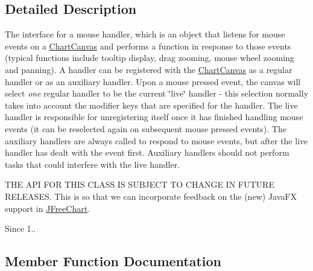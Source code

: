 \subsection{Detailed Description}
The interface for a mouse handler, which is an object that listens for mouse events on a \mbox{\hyperlink{classorg_1_1jfree_1_1chart_1_1fx_1_1_chart_canvas}{Chart\+Canvas}} and performs a function in response to those events (typical functions include tooltip display, drag zooming, mouse wheel zooming and panning). A handler can be registered with the \mbox{\hyperlink{classorg_1_1jfree_1_1chart_1_1fx_1_1_chart_canvas}{Chart\+Canvas}} as a regular handler or as an auxiliary handler. Upon a mouse pressed event, the canvas will select {\itshape one} regular handler to be the current \char`\"{}live\char`\"{} handler -\/ this selection normally takes into account the modifier keys that are specified for the handler. The live handler is responsible for unregistering itself once it has finished handling mouse events (it can be reselected again on subsequent mouse pressed events). The auxiliary handlers are always called to respond to mouse events, but after the live handler has dealt with the event first. Auxiliary handlers should not perform tasks that could interfere with the live handler.

T\+HE A\+PI F\+OR T\+H\+IS C\+L\+A\+SS IS S\+U\+B\+J\+E\+CT TO C\+H\+A\+N\+GE IN F\+U\+T\+U\+RE R\+E\+L\+E\+A\+S\+ES. This is so that we can incorporate feedback on the (new) Java\+FX support in \mbox{\hyperlink{classorg_1_1jfree_1_1chart_1_1_j_free_chart}{J\+Free\+Chart}}.

\begin{DoxySince}{Since}
1.. 
\end{DoxySince}


\subsection{Member Function Documentation}
\mbox{\label{interfaceorg_1_1jfree_1_1chart_1_1fx_1_1interaction_1_1_mouse_handler_f_x_a7da90cbead6cf1df2d6dacc8e729e69a}} 
